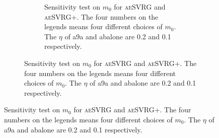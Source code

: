 \documentclass[conference]{IEEEtran}
\begin{document}
\begin{algorithm}[t]
\begin{itemize}
\begin{figure}[ht]
\begin{figure}[ht]
 \begin{figure}[ht]
 \label{aeSVRG_aeSVRG+}
\centering
{}
\caption{Sensitivity test on $m_0$ for \textsc{aeSVRG} and \textsc{aeSVRG+}. The four numbers on the legends means four different choices of $m_0$. The $\eta$ of a9a and abalone are 0.2 and 0.1 respectively.}


\end{figure}
\end{figure}
\end{figure}
\end{itemize}
\end{algorithm}
\end{document}
